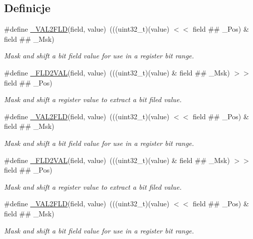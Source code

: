 \subsection*{Definicje}
\begin{DoxyCompactItemize}
\item 
\#define \hyperlink{group___c_m_s_i_s__core__bitfield_ga286e3b913dbd236c7f48ea70c8821f4e}{\+\_\+\+V\+A\+L2\+F\+LD}(field,  value)~(((uint32\+\_\+t)(value) $<$$<$ field \#\# \+\_\+\+Pos) \& field \#\# \+\_\+\+Msk)
\begin{DoxyCompactList}\small\item\em Mask and shift a bit field value for use in a register bit range. \end{DoxyCompactList}\item 
\#define \hyperlink{group___c_m_s_i_s__core__bitfield_ga139b6e261c981f014f386927ca4a8444}{\+\_\+\+F\+L\+D2\+V\+AL}(field,  value)~(((uint32\+\_\+t)(value) \& field \#\# \+\_\+\+Msk) $>$$>$ field \#\# \+\_\+\+Pos)
\begin{DoxyCompactList}\small\item\em Mask and shift a register value to extract a bit filed value. \end{DoxyCompactList}\item 
\#define \hyperlink{group___c_m_s_i_s__core__bitfield_ga286e3b913dbd236c7f48ea70c8821f4e}{\+\_\+\+V\+A\+L2\+F\+LD}(field,  value)~(((uint32\+\_\+t)(value) $<$$<$ field \#\# \+\_\+\+Pos) \& field \#\# \+\_\+\+Msk)
\begin{DoxyCompactList}\small\item\em Mask and shift a bit field value for use in a register bit range. \end{DoxyCompactList}\item 
\#define \hyperlink{group___c_m_s_i_s__core__bitfield_ga139b6e261c981f014f386927ca4a8444}{\+\_\+\+F\+L\+D2\+V\+AL}(field,  value)~(((uint32\+\_\+t)(value) \& field \#\# \+\_\+\+Msk) $>$$>$ field \#\# \+\_\+\+Pos)
\begin{DoxyCompactList}\small\item\em Mask and shift a register value to extract a bit filed value. \end{DoxyCompactList}\item 
\#define \hyperlink{group___c_m_s_i_s__core__bitfield_ga286e3b913dbd236c7f48ea70c8821f4e}{\+\_\+\+V\+A\+L2\+F\+LD}(field,  value)~(((uint32\+\_\+t)(value) $<$$<$ field \#\# \+\_\+\+Pos) \& field \#\# \+\_\+\+Msk)
\begin{DoxyCompactList}\small\item\em Mask and shift a bit field value for use in a register bit range. \end{DoxyCompactList}\item 
$$
\end{DoxyCompactItemize}
